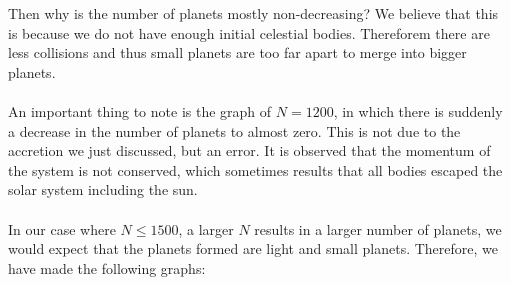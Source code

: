 Then why is the number of planets mostly non-decreasing? We believe that this is because we do not have enough initial celestial bodies. Thereforem there are less collisions and thus small planets are too far apart to merge into bigger planets.\\
\\
An important thing to note is the graph of $N=1200$, in which there is suddenly a decrease in the number of planets to almost zero. This is not due to the accretion we just discussed, but an error. It is observed that the momentum of the system is not conserved, which sometimes results that all bodies escaped the solar system including the sun.\\
\\
In our case where $N\leq 1500$, a larger $N$ results in a larger number of planets, we would expect that the planets formed are light and small planets. Therefore, we have made the following graphs:
